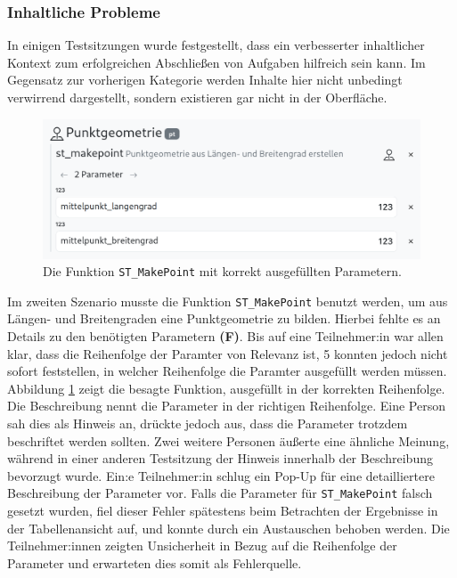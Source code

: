 \subsubsection{Inhaltliche Probleme}
In einigen Testsitzungen wurde festgestellt, dass ein verbesserter inhaltlicher Kontext zum erfolgreichen Abschließen von Aufgaben hilfreich sein kann. Im Gegensatz zur vorherigen Kategorie werden Inhalte hier nicht unbedingt verwirrend dargestellt, sondern existieren gar nicht in der Oberfläche.

\begin{figure}[!ht]
  \centering
  \includegraphics[width=.9\textwidth]{assets/st-makepoint.png}
  \caption{Die Funktion \texttt{ST\_MakePoint} mit korrekt ausgefüllten Parametern.}
  \label{fig:parameters}
\end{figure}
Im zweiten Szenario musste die Funktion \texttt{ST\_MakePoint} benutzt werden, um aus Längen- und Breitengraden eine Punktgeometrie zu bilden. Hierbei fehlte es an Details zu den benötigten Parametern \textbf{(F)}. Bis auf eine Teilnehmer:in war allen klar, dass die Reihenfolge der Paramter von Relevanz ist, 5 konnten jedoch nicht sofort feststellen, in welcher Reihenfolge die Paramter ausgefüllt werden müssen. Abbildung \ref{fig:parameters} zeigt die besagte Funktion, ausgefüllt in der korrekten Reihenfolge. Die Beschreibung nennt die Parameter in der richtigen Reihenfolge. Eine Person sah dies als Hinweis an, drückte jedoch aus, dass die Parameter trotzdem beschriftet werden sollten. Zwei weitere Personen äußerte eine ähnliche Meinung, während in einer anderen Testsitzung der Hinweis innerhalb der Beschreibung bevorzugt wurde. Ein:e Teilnehmer:in schlug ein Pop-Up für eine detailliertere Beschreibung der Parameter vor. Falls die Parameter für \texttt{ST\_MakePoint} falsch gesetzt wurden, fiel dieser Fehler spätestens beim Betrachten der Ergebnisse in der Tabellenansicht auf, und konnte durch ein Austauschen behoben werden. Die Teilnehmer:innen zeigten Unsicherheit in Bezug auf die Reihenfolge der Parameter und erwarteten dies somit als Fehlerquelle.

